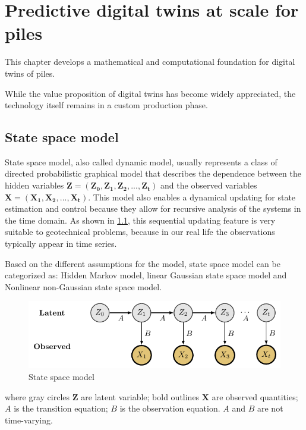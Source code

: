

\chapter{Predictive digital twins at scale for piles}
\label{DT}

This chapter develops a mathematical and computational foundation for digital twins of piles.

While the value proposition of digital twins has become widely appreciated, the technology itself remains in a custom production phase.



\section{State space model}




State space model, also called dynamic model, usually represents a class of directed probabilistic graphical model that describes the dependence between the hidden variables $\boldsymbol{Z} = (\boldsymbol{Z_0},\boldsymbol{Z_1},\boldsymbol{Z_2},...,\boldsymbol{Z_t})$ and the observed variables $\boldsymbol{X} = (\boldsymbol{X_1},\boldsymbol{X_2},...,\boldsymbol{X_t})$. This model also enables a dynamical updating for state estimation and control because they allow for recursive analysis of the systems in the time domain. As shown in \cref{fig: state-space-model}, this sequential updating feature is very suitable to geotechnical problems, because in our real life the observations typically appear in time series.



Based on the different assumptions for the model, state space model can be categorized as: Hidden Markov model, linear Gaussian state space model and Nonlinear non-Gaussian state space model.
\begin{figure}[H]
    \centering
    \includegraphics[width = 140mm]{Figures/figure-SSM.pdf}
    \caption{State space model}
    \label{fig: state-space-model}
\end{figure}
where gray circles $\boldsymbol{Z}$ are latent variable; bold outlines $\boldsymbol{X}$ are observed quantities; $A$ is the transition equation; $B$ is the observation equation. $A$ and $B$ are not time-varying.

